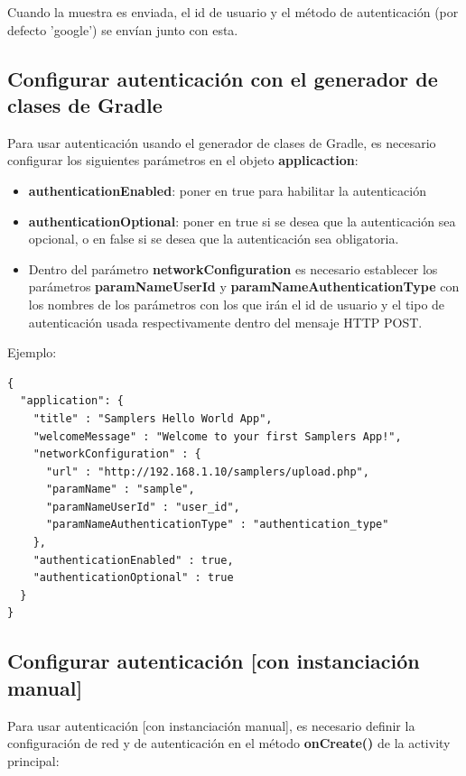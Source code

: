 Cuando la muestra es enviada, el id de usuario y el método de autenticación (por defecto 'google') se envían junto con esta.


\subsection{Configurar autenticación con el generador de clases de Gradle}

Para usar autenticación usando el generador de clases de Gradle, es necesario configurar los siguientes parámetros en el objeto \textbf{applicaction}:

\begin{itemize}

	\item \textbf{authenticationEnabled}: poner en true para habilitar la autenticación
		
	\item \textbf{authenticationOptional}: poner en true si se desea que la autenticación sea opcional, o en false si se desea que la autenticación sea obligatoria.
	
	\item Dentro del parámetro \textbf{networkConfiguration} es necesario establecer los parámetros \textbf{paramNameUserId} y \textbf{paramNameAuthenticationType} con los nombres de los parámetros con los que irán el id de usuario y el tipo de autenticación usada respectivamente dentro del mensaje HTTP POST.
	

\end{itemize}

Ejemplo:

\begin{lstlisting}[language=XML, frame=tlb]	
{
  "application": {
    "title" : "Samplers Hello World App",
    "welcomeMessage" : "Welcome to your first Samplers App!",
    "networkConfiguration" : {
      "url" : "http://192.168.1.10/samplers/upload.php",
      "paramName" : "sample",
      "paramNameUserId" : "user_id",
      "paramNameAuthenticationType" : "authentication_type"
    },
    "authenticationEnabled" : true,
    "authenticationOptional" : true
  } 
}
\end{lstlisting}

\subsection{Configurar autenticación [con instanciación manual]}

Para usar autenticación [con instanciación manual], es necesario definir la configuración de red y de autenticación en el método \textbf{onCreate()} de la activity principal:

